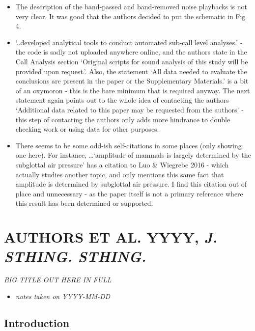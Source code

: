 \documentclass[
]{book}
\providecommand{\tightlist}{%
  \setlength{\itemsep}{0pt}\setlength{\parskip}{0pt}}
\begin{document}
\begin{itemize}
\tightlist
\item
  The description of the band-passed and band-removed noise playbacks is not very clear. It was good that the authors decided to put the schematic in Fig 4.
\item
  `..developed analytical tools to conduct automated sub-call level analyses.' - the code is sadly not uploaded anywhere online, and the authors state in the Call Analysis section `Original scripts for sound analysis of this study will be provided upon request.'. Also, the statement `All data needed to evaluate the conclusions are present in the paper or the Supplementary Materials.' is a bit of an oxymoron - this is the bare minimum that is required anyway. The next statement again points out to the whole idea of contacting the authors `Additional data related to this paper may be requested from the authors' - this step of contacting the authors only adds more hindrance to double checking work or using data for other purposes.
\item
  There seems to be some odd-ish self-citations in some places (only showing one here). For instance, \ldots{}`amplitude of mammals is largely determined by the subglottal air pressure' has a citation to Luo \& Wiegrebe 2016 - which actually studies another topic, and only mentions this same fact that amplitude is determined by subglottal air pressure. I find this citation
  out of place and unnecessary - as the paper itself is not a primary reference where this result has been determined or supported.
\end{itemize}

\hypertarget{authors-et-al.-yyyy-j.-sthing.-sthing.}{%
\chapter{\texorpdfstring{AUTHORS ET AL. YYYY, \emph{J. STHING. STHING.}}{AUTHORS ET AL. YYYY, J. STHING. STHING.}}\label{authors-et-al.-yyyy-j.-sthing.-sthing.}}


\emph{BIG TITLE OUT HERE IN FULL} \citep{schuchmannsiemers2010a}

\begin{itemize}
\tightlist
\item
  \emph{notes taken on YYYY-MM-DD}
\end{itemize}

\hypertarget{introduction}{%
\section{Introduction}\label{introduction}}
\end{document}
